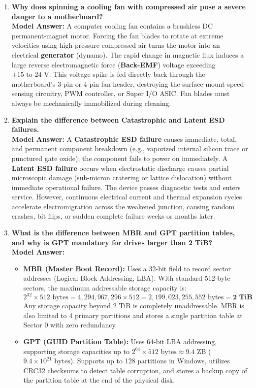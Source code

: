 \begin{enumerate}[leftmargin=*,label=\textbf{Q\arabic*.}]
    \item \textbf{Why does spinning a cooling fan with compressed air pose a severe danger to a motherboard?} \\
    \textbf{Model Answer:} A computer cooling fan contains a brushless DC permanent-magnet motor. Forcing the fan blades to rotate at extreme velocities using high-pressure compressed air turns the motor into an electrical \textbf{generator} (dynamo). The rapid change in magnetic flux induces a large reverse electromagnetic force (\textbf{Back-EMF}) voltage exceeding $+15\text{ to }24\text{ V}$. This voltage spike is fed directly back through the motherboard's 3-pin or 4-pin fan header, destroying the surface-mount speed-sensing circuitry, PWM controller, or Super I/O ASIC. Fan blades must always be mechanically immobilized during cleaning.

    \item \textbf{Explain the difference between Catastrophic and Latent ESD failures.} \\
    \textbf{Model Answer:} A \textbf{Catastrophic ESD failure} causes immediate, total, and permanent component breakdown (e.g., vaporized internal silicon trace or punctured gate oxide); the component fails to power on immediately. A \textbf{Latent ESD failure} occurs when electrostatic discharge causes partial microscopic damage (sub-micron cratering or lattice dislocation) without immediate operational failure. The device passes diagnostic tests and enters service. However, continuous electrical current and thermal expansion cycles accelerate electromigration across the weakened junction, causing random crashes, bit flips, or sudden complete failure weeks or months later.

    \item \textbf{What is the difference between MBR and GPT partition tables, and why is GPT mandatory for drives larger than 2 TiB?} \\
    \textbf{Model Answer:}
    \begin{itemize}
        \item \textbf{MBR (Master Boot Record):} Uses a 32-bit field to record sector addresses (Logical Block Addressing, LBA). With standard 512-byte sectors, the maximum addressable storage capacity is:
        \[
        2^{32} \times 512\text{ bytes} = 4,294,967,296 \times 512 = 2,199,023,255,552\text{ bytes} = \mathbf{2\text{ TiB}}
        \]
        Any storage capacity beyond $2\text{ TiB}$ is completely unaddressable. MBR is also limited to 4 primary partitions and stores a single partition table at Sector 0 with zero redundancy.
        \item \textbf{GPT (GUID Partition Table):} Uses 64-bit LBA addressing, supporting storage capacities up to $2^{64} \times 512\text{ bytes} \approx 9.4\text{ ZB}$ ($9.4 \times 10^{21}\text{ bytes}$). Supports up to 128 partitions in Windows, utilizes CRC32 checksums to detect table corruption, and stores a backup copy of the partition table at the end of the physical disk.
    \end{itemize}


\end{enumerate}
